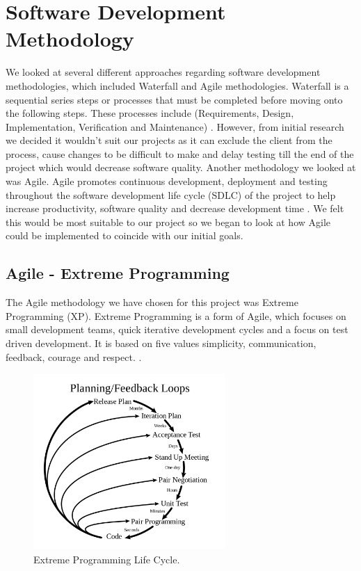 \section{Software Development Methodology}
We looked at several different approaches regarding software development methodologies, which included Waterfall and Agile methodologies. Waterfall is a sequential series steps or processes that must be completed before moving onto the following steps. These processes include (Requirements, Design, Implementation, Verification and Maintenance) \cite{cheatham1991object}. However, from initial research we decided it wouldn't suit our projects as it can exclude the client from the process, cause changes to be difficult to make and delay testing till the end of the project which would decrease software quality. Another methodology we looked at was Agile. Agile promotes continuous development, deployment and testing throughout the software development life cycle (SDLC) of the project to help increase productivity, software quality and decrease development time \cite{Cohen2003AgileSD}. We felt this would be most suitable to our project so we began to look at how Agile could be implemented to coincide with our initial goals.

\subsection{Agile - Extreme Programming}
The Agile methodology we have chosen for this project was Extreme Programming (XP). Extreme Programming is a form of Agile, which focuses on small development teams, quick iterative development cycles and a focus on test driven development. It is based on five values simplicity, communication, feedback, courage and respect. \cite[p.~4]{1335275620040101}. 

\begin{figure}[h!]
	\caption{Extreme Programming Life Cycle.}
	\label{image:XP}
	\centering
	\includegraphics[width=0.65\textwidth]{Images/Extreme_Programming.png}
\end{figure}	

